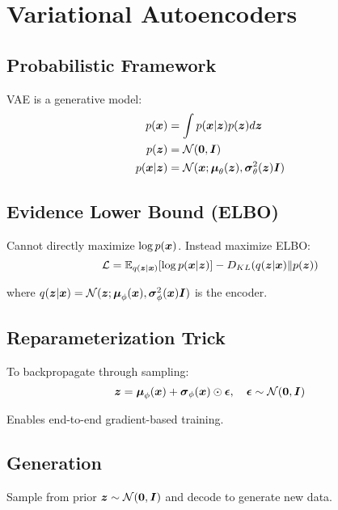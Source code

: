 
\section{Variational Autoencoders}
\label{sec:vae}

\subsection{Probabilistic Framework}

VAE is a generative model:
\begin{align}
p(\boldsymbol{x}) &= \int p(\boldsymbol{x}|\boldsymbol{z}) p(\boldsymbol{z}) d\boldsymbol{z} \\
p(\boldsymbol{z}) &= \mathcal{N}(\boldsymbol{0}, \boldsymbol{I}) \\
p(\boldsymbol{x}|\boldsymbol{z}) &= \mathcal{N}(\boldsymbol{x}; \boldsymbol{\mu}_{\theta}(\boldsymbol{z}), \boldsymbol{\sigma}^2_{\theta}(\boldsymbol{z})\boldsymbol{I})
\end{align}

\subsection{Evidence Lower Bound (ELBO)}

Cannot directly maximize $\log p(\boldsymbol{x})$. Instead maximize ELBO:
\begin{equation}
\mathcal{L} = \mathbb{E}_{q(\boldsymbol{z}|\boldsymbol{x})}[\log p(\boldsymbol{x}|\boldsymbol{z})] - D_{KL}(q(\boldsymbol{z}|\boldsymbol{x}) \| p(\boldsymbol{z}))
\end{equation}

where $q(\boldsymbol{z}|\boldsymbol{x}) = \mathcal{N}(\boldsymbol{z}; \boldsymbol{\mu}_{\phi}(\boldsymbol{x}), \boldsymbol{\sigma}^2_{\phi}(\boldsymbol{x})\boldsymbol{I})$ is the encoder.

\subsection{Reparameterization Trick}

To backpropagate through sampling:
\begin{equation}
\boldsymbol{z} = \boldsymbol{\mu}_{\phi}(\boldsymbol{x}) + \boldsymbol{\sigma}_{\phi}(\boldsymbol{x}) \odot \boldsymbol{\epsilon}, \quad \boldsymbol{\epsilon} \sim \mathcal{N}(\boldsymbol{0}, \boldsymbol{I})
\end{equation}

Enables end-to-end gradient-based training.

\subsection{Generation}

Sample from prior $\boldsymbol{z} \sim \mathcal{N}(\boldsymbol{0}, \boldsymbol{I})$ and decode to generate new data.

